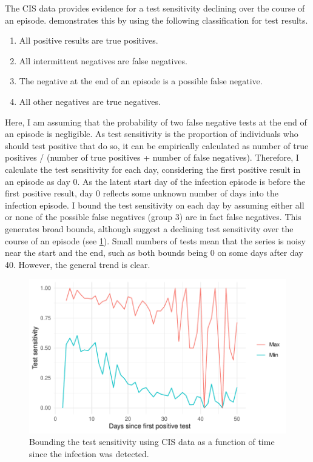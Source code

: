 \documentclass[12pt, letterpaper]{article} %
\makeatletter
\DeclareRobustCommand\onedot{\futurelet\@let@token\@onedot}
\def\@onedot{\ifx\@let@token.\else.\null\fi\xspace}
\def\ie{i.e\onedot} \def\Ie{\emph{I.e}\onedot}
\makeatother
\begin{document}
The CIS data provides evidence for a test sensitivity declining over the course of an episode.
 demonstrates this by using the following classification for test results.
\begin{enumerate}
    \item All positive results are true positives.
    \item All intermittent negatives are false negatives.
    \item The negative at the end of an episode is a possible false negative.
    \item All other negatives are true negatives.
\end{enumerate}
Here, I am assuming that the probability of two false negative tests at the end of an episode is negligible.
As test sensitivity is the proportion of individuals who should test positive that do so, it can be empirically calculated as number of true positives / (number of true positives + number of false negatives).
Therefore, I calculate the test sensitivity for each day, considering the first positive result in an episode as day 0.
As the latent start day of the infection episode is before the first positive result, day 0 reflects some unknown number of days into the infection episode.
I bound the test sensitivity on each day by assuming either all or none of the possible false negatives (group 3) are in fact false negatives.
This generates broad bounds, although suggest a declining test sensitivity over the course of an episode (see \cref{imperf-test:fig:bounding-cis-sensitivity}).
Small numbers of tests mean that the series is noisy near the start and the end, such as both bounds being 0 on some days after day 40.
However, the general trend is clear.
\begin{figure}
  \includegraphics{cis-imperfect-testing/test-sens-bound}
  \caption[Bounding test sensitivity using CIS data]{
    Bounding the test sensitivity using CIS data as a function of time since the infection was detected.
  }
  \label{imperf-test:fig:bounding-cis-sensitivity}
\end{figure}
\end{document}
